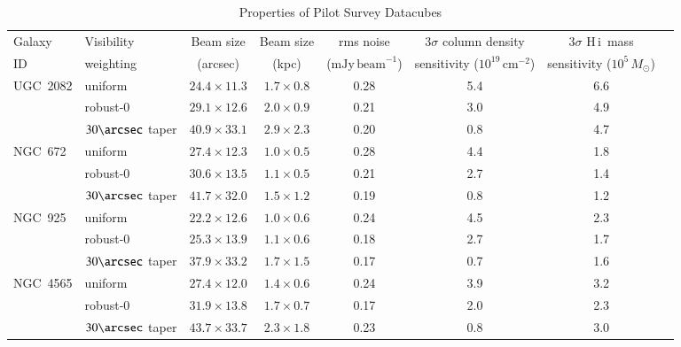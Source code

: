 \documentclass[oldversion]{aa}
\newcommand{\HI}{{\sc H\,i}}
\begin{document}
\begin{table}
\caption{Properties of Pilot Survey Datacubes}
\label{table:cubes}
\centering
\begin{tabular}{llcccccc}
\hline\hline
Galaxy & Visibility & Beam size & Beam size & rms noise & $3\sigma$ column density & $3\sigma$ \HI\ mass \\
ID & weighting & (arcsec) & (kpc) & ($\mathrm{mJy\,beam}^{-1}$) & sensitivity ($10^{19}\,\mathrm{cm}^{-2}$) & sensitivity ($10^5\,M_\odot$) \\
\hline
UGC~2082 & uniform             & $24.4\times11.3$ & $1.7\times0.8$ & 0.28 & 5.4 & 6.6 \\
\,       & robust-0            & $29.1\times12.6$ & $2.0\times0.9$ & 0.21 & 3.0 & 4.9 \\
\,       & $30\arcsec$ taper   & $40.9\times33.1$ & $2.9\times2.3$ & 0.20 & 0.8 & 4.7 \\
NGC~672  & uniform             & $27.4\times12.3$ & $1.0\times0.5$ & 0.28 & 4.4 & 1.8 \\
\,       & robust-0            & $30.6\times13.5$ & $1.1\times0.5$ & 0.21 & 2.7 & 1.4 \\
\,       & $30\arcsec$ taper   & $41.7\times32.0$ & $1.5\times1.2$ & 0.19 & 0.8 & 1.2 \\
NGC~925  & uniform             & $22.2\times12.6$ & $1.0\times0.6$ & 0.24 & 4.5 & 2.3 \\
\,       & robust-0            & $25.3\times13.9$ & $1.1\times0.6$ & 0.18 & 2.7 & 1.7 \\
\,       & $30\arcsec$ taper   & $37.9\times33.2$ & $1.7\times1.5$ & 0.17 & 0.7 & 1.6 \\
NGC~4565 & uniform             & $27.4\times12.0$ & $1.4\times0.6$ & 0.24 & 3.9 & 3.2 \\
\,       & robust-0            & $31.9\times13.8$ & $1.7\times0.7$ & 0.17 & 2.0 & 2.3 \\
\,       & $30\arcsec$ taper   & $43.7\times33.7$ & $2.3\times1.8$ & 0.23 & 0.8 & 3.0 \\
\hline
\end{tabular}
\end{table}
\end{document}
